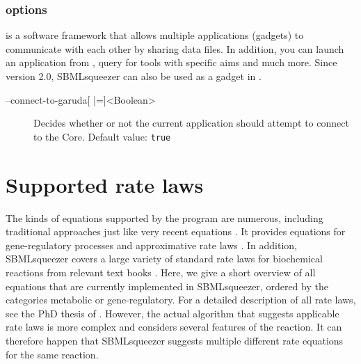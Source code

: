 \subsection{\Garuda options}

\Garuda is a software framework that allows multiple applications (gadgets) to
communicate with each other by sharing data files. In addition, you can launch
an application from \Garuda, query for tools with specific aims and much more.
Since version 2.0, SBMLsqueezer can also be used as a gadget in \Garuda.

\begin{description}
\item[--connect-to-garuda{[} |={]}<Boolean>]
  Decides whether or not the current application should attempt to connect to
  the \Garuda Core. Default value: \texttt{true}
\end{description}
\renewcommand{\descriptionlabel}[1]{\textcolor{black}{\textbf{#1}}}

\chapter{Supported rate laws}\label{chap:RateLaws}

The kinds of equations supported by the program are
numerous, including traditional approaches \citep{Guldberg1879, Michaelis1913}
just like very recent equations \citep{Liebermeister2006, Liebermeister2010}.
It provides equations for gene-regulatory processes
\citep{Hinze2007, Radde2007a, Toepfer2007, Vu2007,Weaver1999} and approximative
rate laws \citep{Savageau1969}.
In addition, SBMLsqueezer covers a large variety of standard rate laws for
biochemical reactions from relevant text books
\citep{Segel1993, Heinrich1996, Bisswanger2000, Cornish-Bowden2004}.
Here, we give a short overview of all equations that are currently implemented
in SBMLsqueezer, ordered by the categories metabolic or gene-regulatory.
For a detailed description of all rate laws, see the PhD thesis of \citealp{Draeger2011a}.
However, the actual algorithm that suggests applicable rate laws is more complex
and considers several features of the reaction.
It can therefore happen that SBMLsqueezer suggests multiple different rate
equations for the same reaction.

